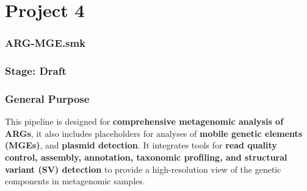 \documentclass[11pt]{article}
\begin{document}
\part{Project 4}
\section*{ ARG-MGE.smk}
\section*{Stage: Draft}   
\section*{General Purpose}

This pipeline is designed for \textbf{comprehensive metagenomic analysis of ARGs}, it also includes placeholders for analyses of \textbf{mobile genetic elements (MGEs)}, and \textbf{plasmid detection}. It integrates tools for \textbf{read quality control, assembly, annotation, taxonomic profiling, and structural variant (SV) detection} to provide a high-resolution view of the genetic components in metagenomic samples.
\end{document}
